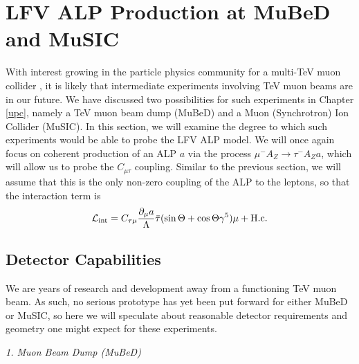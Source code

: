 \section{LFV ALP Production at MuBeD and MuSIC}\label{sec:MuBeD_MuSIC_ALP}
With interest growing in the particle physics community for a multi-TeV muon collider \cite{Delahaye:2013jla,Long:2020wfp,Accettura:2023ked}, it is likely that intermediate experiments involving TeV muon beams are in our future. We have discussed two possibilities for such experiments in Chapter \ref{upc}, namely a TeV muon beam dump (MuBeD) and a Muon (Synchrotron) Ion Collider (MuSIC). In this section, we will examine the degree to which such experiments would be able to probe the LFV ALP model. We will once again focus on coherent production of an ALP $a$ via the process $\mu^- A_Z \rightarrow \tau^- A_Z a$, which will allow us to probe the $C_{\mu \tau}$ coupling. Similar to the previous section, we will assume that this is the only non-zero coupling of the ALP to the leptons, so that the interaction term is
\begin{align}
    {\cal L}_{\rm int} = C_{\tau\mu}\frac{\partial_\mu a}{\Lambda}\bar{\tau}(\sin{\Theta}+\cos{\Theta}\gamma^5)\mu + {\rm H.c.}
\end{align}

\subsection{Detector Capabilities}\label{sec:MuSIC_MuBeD_ALP_detector}
We are years of research and development away from a functioning TeV muon beam. As such, no serious prototype has yet been put forward for either MuBeD or MuSIC, so here we will speculate about reasonable detector requirements and geometry one might expect for these experiments. 

\begin{center}
{\it 1. Muon Beam Dump (MuBeD)}
\end{center}

